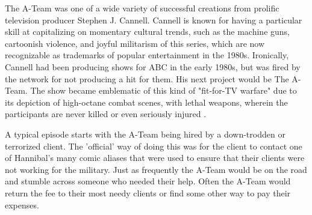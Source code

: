 The A-Team was one of a wide variety of successful creations from prolific television producer Stephen J. Cannell. Cannell is known for having a particular skill at capitalizing on momentary cultural trends, such as the machine guns, cartoonish violence, and joyful militarism of this series, which are now recognizable as trademarks of popular entertainment in the 1980s. Ironically, Cannell had been producing shows for ABC in the early 1980s, but was fired by the network for not producing a hit for them. His next project would be The A-Team. The show became emblematic of this kind of "fit-for-TV warfare" due to its depiction of high-octane combat scenes, with lethal weapons, wherein the participants are never killed or even seriously injured \cite{Sola:1999a}.

A typical episode starts with the A-Team being hired by a down-trodden or terrorized client. The 'official' way of doing this was for the client to contact one of Hannibal's many comic aliases \cite{Itano:1990a} that were used to ensure that their clients were not working for the military. Just as frequently the A-Team would be on the road and stumble across someone who needed their help. Often the A-Team would return the fee to their most needy clients or find some other way to pay their expenses.


